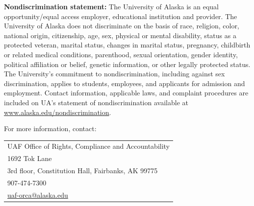 \documentclass[11pt]{article}
\renewcommand{\emph}[1]{\textsf{\textbf{#1}}}
\begin{document}
\noindent\emph{Nondiscrimination statement:}
The University of Alaska is an equal opportunity/equal access employer, educational institution and provider. The University of Alaska does not discriminate on the basis of race, religion, color, national origin, citizenship, age, sex, physical or mental disability, status as a protected veteran, marital status, changes in marital status, pregnancy, childbirth or related medical conditions, parenthood, sexual orientation, gender identity, political affiliation or belief, genetic information, or other legally protected status. The University's commitment to nondiscrimination, including against sex discrimination, applies to students, employees, and applicants for admission and employment. Contact information, applicable laws, and complaint procedures are included on UA's statement of nondiscrimination available at \url{www.alaska.edu/nondiscrimination}.


For more information, contact: 
\begin{tabular}{l}
UAF Office of Rights, Compliance and Accountability\\
1692 Tok Lane\\
3rd floor, Constitution Hall, Fairbanks, AK 99775\\
907-474-7300\\
\url{uaf-orca@alaska.edu}
\end{tabular}
\end{document}
